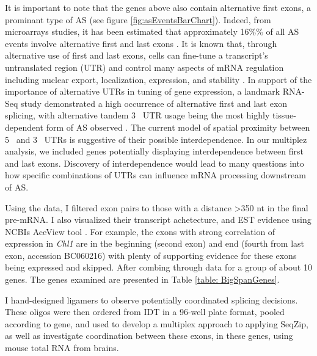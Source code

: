   It is important to note that the genes above also contain alternative first exons, a prominant type of AS (see figure \ref{fig:asEventsBarChart}). Indeed, from microarrays studies, it has been estimated that approximately 16\%\% of all AS events involve alternative first and last exons \citep{Bingham2008a}. It is known that, through alternative use of first and last exons, cells can fine-tune a transcript’s untranslated region (UTR) and control many aspects of mRNA regulation including nuclear export, localization, expression, and stability \citep{Hughes2006}. In support of the importance of alternative UTRs in tuning of gene expression, a landmark RNA-Seq study demonstrated a high occurrence of alternative first and last exon splicing, with alternative tandem 3\textprime~ UTR usage being the most highly tissue-dependent form of AS observed \citep{Wang2008}. The current model of spatial proximity between 5\textprime~ and 3\textprime~ UTRs is suggestive of their possible interdependence. In our multiplez analysis, we included genes potentially displaying interdependence between first and last exons. Discovery of interdependence would lead to many questions into how specific combinations of UTRs can influence mRNA processing downstream of AS.

  Using the \citet{Fagnani2007} data, I filtered exon pairs to those with a distance >350 nt in the final pre-mRNA. I also visualized their transcript achetecture, and EST evidence using NCBIs AceView tool \citep{Thierry-Mieg2006}. For example, the exons with strong correlation of expression in \textit{Chl1} are in the beginning (second exon) and end (fourth from last exon, accession BC060216) with plenty of supporting evidence for these exons being expressed and skipped. After combing through \citep{Fagnani2007} data for a group of about 10 genes. The genes examined are presented in Table \ref{table: BigSpanGenes}.

  

  I hand-designed ligamers to observe potentially coordinated splicing decisions. These oligos were then ordered from IDT in a 96-well plate format, pooled according to gene, and used to develop a multiplex approach to applying SeqZip, as well as investigate coordination between these exons, in these genes, using mouse total RNA from brains.

